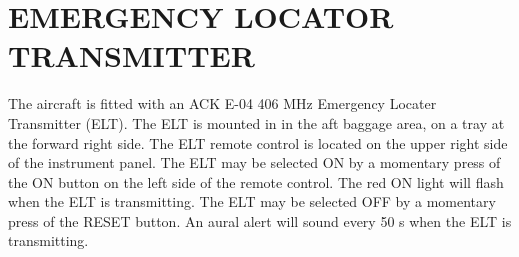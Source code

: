\section{EMERGENCY LOCATOR TRANSMITTER}

The aircraft is fitted with an ACK E-04 406 MHz Emergency Locater Transmitter (ELT). The ELT is mounted in in the aft baggage area, on a tray at the forward right side. The ELT remote control is located on the upper right side of the instrument panel. The ELT may be selected ON by a momentary press of the ON button on the left side of the remote control. The red ON light will flash when the ELT is transmitting. The ELT may be selected OFF by a momentary press of the RESET button. An aural alert will sound every 50 s when the ELT is transmitting.

